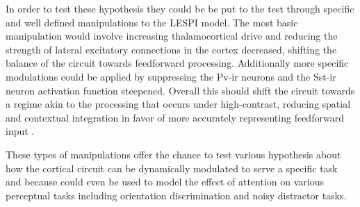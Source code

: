 In order to test these hypothesis they could be be put to the test
through specific and well defined manipulations to the LESPI
model. The most basic manipulation would involve increasing
thalamocortical drive and reducing the strength of lateral excitatory
connections in the cortex decreased, shifting the balance of the
circuit towards feedforward processing. Additionally more specific
modulations could be applied by suppressing the Pv-ir neurons and the
Sst-ir neuron activation function steepened. Overall this should shift
the circuit towards a regime akin to the processing that occurs under
high-contrast, reducing spatial and contextual integration in favor of
more accurately representing feedforward input \citep{Roberts2005,
  Roberts2008a, Roberts2008b}.

These types of manipulations offer the chance to test various
hypothesis about how the cortical circuit can be dynamically modulated
to serve a specific task and because could even be used to model the
effect of attention on various perceptual tasks including orientation
discrimination and noisy distractor tasks.

